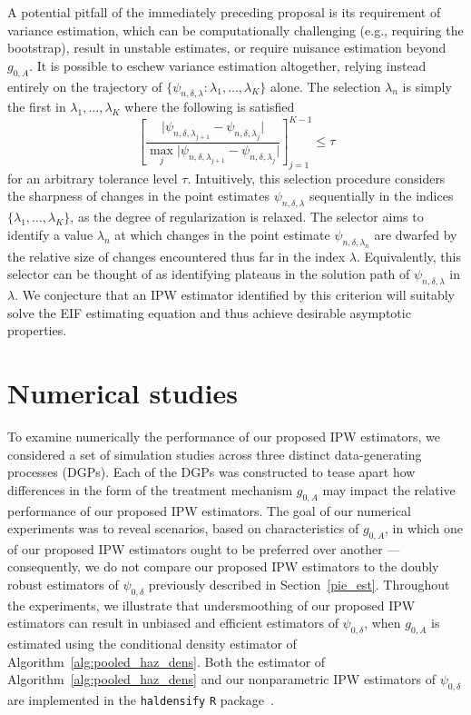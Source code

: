 A potential pitfall of the immediately preceding proposal is its requirement of
variance estimation, which can be computationally challenging (e.g., requiring
the bootstrap), result in unstable estimates, or require nuisance estimation
beyond $g_{0,A}$. It is possible to eschew variance estimation altogether,
relying instead entirely on the trajectory of $\{\psi_{n,\delta,\lambda}:
\lambda_1, \ldots, \lambda_K \}$ alone. The selection $\lambda_n$ is simply the
first in $\lambda_1, \ldots, \lambda_K$ where the following is satisfied
\begin{equation}\label{eqn:plateau_psi_rel}
 \left[\frac{\lvert \psi_{n,\delta,\lambda_{j+1}} - \psi_{n,\delta,\lambda_j}
 \rvert} {\max_j \lvert \psi_{n,\delta,\lambda_{j+1}} -
 \psi_{n,\delta,\lambda_j} \rvert} \right]_{j=1}^{K-1} \leq \tau
\end{equation}
for an arbitrary tolerance level $\tau$. Intuitively, this selection procedure
considers the sharpness of changes in the point estimates
$\psi_{n,\delta,\lambda}$ sequentially in the indices $\{\lambda_1, \ldots,
\lambda_K\}$, as the degree of regularization is relaxed. The selector aims to
identify a value $\lambda_n$ at which changes in the point estimate
$\psi_{n,\delta,\lambda_n}$ are dwarfed by the relative size of changes
encountered thus far in the index $\lambda$. Equivalently, this selector can be
thought of as identifying plateaus in the solution path of $\psi_{n,\delta,
\lambda}$ in $\lambda$. We conjecture that an IPW estimator identified by this
criterion will suitably solve the EIF estimating equation and thus achieve
desirable asymptotic properties.


\section{Numerical studies}\label{sim}

To examine numerically the performance of our proposed IPW estimators, we
considered a set of simulation studies across three distinct data-generating
processes (DGPs). Each of the DGPs was constructed to tease apart how
differences in the form of the treatment mechanism $g_{0,A}$ may impact the
relative performance of our proposed IPW estimators. The goal of our numerical
experiments was to reveal scenarios, based on characteristics of $g_{0,A}$, in
which one of our proposed IPW estimators ought to be preferred over another ---
consequently, we do not compare our proposed IPW estimators to the doubly robust
estimators of $\psi_{0,\delta}$ previously described in Section~\ref{pie_est}.
Throughout the experiments, we illustrate that undersmoothing of our proposed
IPW estimators can result in unbiased and efficient estimators of
$\psi_{0,\delta}$, when $g_{0,A}$ is estimated using the conditional density
estimator of Algorithm~\ref{alg:pooled_haz_dens}. Both the estimator of
Algorithm~\ref{alg:pooled_haz_dens} and our nonparametric IPW estimators of
$\psi_{0,\delta}$ are implemented in the \texttt{haldensify} \texttt{R}
package~\citep{hejazi2020haldensify}.

